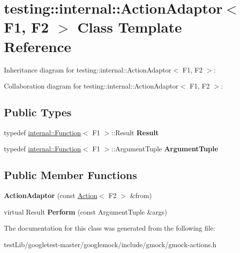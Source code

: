\hypertarget{classtesting_1_1internal_1_1ActionAdaptor}{}\section{testing\+:\+:internal\+:\+:Action\+Adaptor$<$ F1, F2 $>$ Class Template Reference}
\label{classtesting_1_1internal_1_1ActionAdaptor}


Inheritance diagram for testing\+:\+:internal\+:\+:Action\+Adaptor$<$ F1, F2 $>$\+:


Collaboration diagram for testing\+:\+:internal\+:\+:Action\+Adaptor$<$ F1, F2 $>$\+:
\subsection*{Public Types}
\begin{DoxyCompactItemize}
\item 
\mbox{\label{classtesting_1_1internal_1_1ActionAdaptor_afa8f7872b6db3d8f1545fd98b45b0b95}} 
typedef \hyperlink{structtesting_1_1internal_1_1Function}{internal\+::\+Function}$<$ F1 $>$\+::Result {\bfseries Result}
\item 
\mbox{\label{classtesting_1_1internal_1_1ActionAdaptor_a4f78fb73f97b72fea8a93b78a8ab5704}} 
typedef \hyperlink{structtesting_1_1internal_1_1Function}{internal\+::\+Function}$<$ F1 $>$\+::Argument\+Tuple {\bfseries Argument\+Tuple}
\end{DoxyCompactItemize}
\subsection*{Public Member Functions}
\begin{DoxyCompactItemize}
\item 
\mbox{\label{classtesting_1_1internal_1_1ActionAdaptor_a24ba3330ef3cc365b956c50ec73e4177}} 
{\bfseries Action\+Adaptor} (const \hyperlink{classtesting_1_1Action}{Action}$<$ F2 $>$ \&from)
\item 
\mbox{\label{classtesting_1_1internal_1_1ActionAdaptor_a8d8a47a31f068cf6e0c95b91605d5540}} 
virtual Result {\bfseries Perform} (const Argument\+Tuple \&args)
\end{DoxyCompactItemize}


The documentation for this class was generated from the following file\+:\begin{DoxyCompactItemize}
\item 
test\+Lib/googletest-\/master/googlemock/include/gmock/gmock-\/actions.\+h\end{DoxyCompactItemize}
